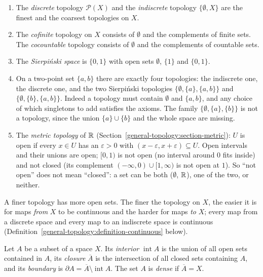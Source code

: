 \begin{example}\label{general-topology:example-topologies}
\begin{enumerate}
\item The \emph{discrete} topology $\mathcal{P}(X)$ and the \emph{indiscrete} topology $\{\emptyset, X\}$ are the finest and the
coarsest topologies on $X$.
\item The \emph{cofinite} topology on $X$ consists of $\emptyset$ and the complements of finite sets. The \emph{cocountable} topology
consists of $\emptyset$ and the complements of countable sets.
\item The \emph{Sierpi\'nski space} is $\{0, 1\}$ with open sets $\emptyset$, $\{1\}$ and $\{0, 1\}$.
\item On a two-point set $\{a, b\}$ there are exactly four topologies: the indiscrete one, the discrete one, and the two Sierpi\'nski topologies $\{\emptyset, \{a\}, \{a, b\}\}$ and
$\{\emptyset, \{b\}, \{a, b\}\}$. Indeed a topology must contain $\emptyset$ and $\{a, b\}$, and any choice of which singletons to add satisfies the axioms. The family $\{\emptyset, \{a\}, \{b\}\}$ is not a
topology, since the union $\{a\} \cup \{b\}$ and the whole space are missing.
\item The \emph{metric topology} of $\mathbb{R}$ (Section~\ref{general-topology:section-metric}): $U$ is open if every $x \in U$ has an $\varepsilon > 0$ with $(x - \varepsilon, x + \varepsilon) \subseteq U$. Open
intervals and their unions are open; $[0, 1)$ is not open (no interval around $0$ fits inside) and not closed (its complement $(-\infty, 0) \cup [1, \infty)$ is not open at $1$). So ``not open'' does not mean
``closed'': a set can be both ($\emptyset$, $\mathbb{R}$), one of the two, or neither.
\end{enumerate}
A finer topology has more open sets. The finer the topology on $X$, the easier it is for maps \emph{from} $X$ to be continuous and the harder for maps \emph{to} $X$; every map from a discrete space and every
map to an indiscrete space is continuous (Definition~\ref{general-topology:definition-continuous} below).
\end{example}

\begin{definition}\label{general-topology:definition-closure}
Let $A$ be a subset of a space $X$. Its \emph{interior} $\operatorname{int} A$ is the union of all open sets contained in $A$, its
\emph{closure} $\overline{A}$ is the intersection of all closed sets containing $A$, and its \emph{boundary} is
$\partial A = \overline{A} \setminus \operatorname{int} A$. The set $A$ is \emph{dense} if $\overline{A} = X$.
\end{definition}


